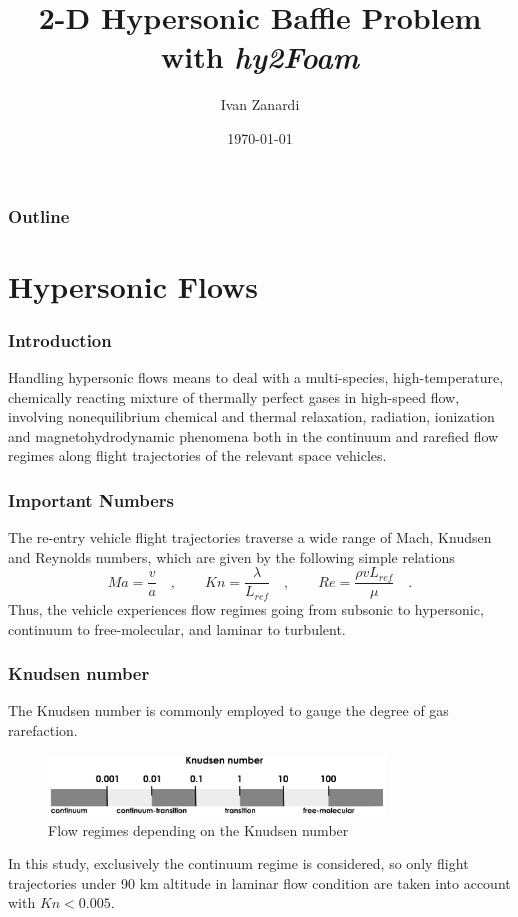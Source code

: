 \documentclass[10pt]{beamer}
\title{2-D Hypersonic Baffle Problem \\with \textit{hy2Foam}}
\author{Ivan Zanardi}
\institute{Politecnico di Milano}
\date{\today}
\begin{document}
\begin{frame}
  \titlepage
\end{frame}

\begin{frame}
  \frametitle{Outline} \tableofcontents
\end{frame}


\section{Hypersonic Flows}

\begin{frame}
  \frametitle{Introduction} Handling hypersonic flows means to deal with a
  multi-species, high-temperature, chemically reacting mixture of thermally
  perfect gases in high-speed flow, involving nonequilibrium chemical and
  thermal relaxation, radiation, ionization and
  ma\-gn\-eto\-hy\-dro\-dy\-na\-mic phenomena both in the continuum and
  rarefied flow regimes along flight trajectories of the relevant space
  vehicles.
\end{frame}

\begin{frame}
  \frametitle{Important Numbers} The re-entry vehicle flight trajectories
  traverse a wide range of Mach, Knudsen and Reynolds numbers, which are given
  by the following simple relations
  \begin{equation*}
    Ma=\frac{v}{a}\quad,\qquad Kn=\frac{\lambda}{L_{ref}}\quad,\qquad
    Re=\frac{\rho vL_{ref}}{\mu}\quad.
  \end{equation*}
  Thus, the vehicle experiences flow regimes going from subsonic to
  hypersonic, continuum to free-molecular, and laminar to turbulent.
\end{frame}

\begin{frame}
  \frametitle{Knudsen number} The Knudsen number is commonly employed to gauge
  the degree of gas rarefaction.
  \begin{figure}[ht]
    \centering \includegraphics[width=0.8\textwidth]{./figures/knudsen.png}
    \caption{Flow regimes depending on the Knudsen number}
    \label{fig:Knudsen}
  \end{figure}
  In this study, exclusively the continuum regime is considered, so only
  flight trajectories under 90 km altitude in laminar flow condition are taken
  into account with $Kn<0.005$.
\end{frame}
\end{document}
